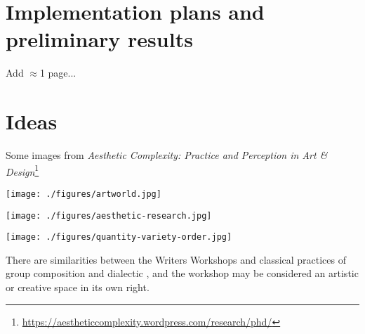 \section{Implementation plans and preliminary results}\label{sec:implementation}

Add $\approx$1 page...

\section{Ideas}

Some images from \emph{Aesthetic Complexity: Practice and Perception in Art \& Design}\footnote{\url{https://aestheticcomplexity.wordpress.com/research/phd/}}

\texttt{[image: ./figures/artworld.jpg]}

\texttt{[image: ./figures/aesthetic-research.jpg]}

\texttt{[image: ./figures/quantity-variety-order.jpg]}


%
%

%




There are similarities between the
Writers Workshops and classical practices of group composition
\cite{jin1975art} and dialectic \cite{dialectique}, and the workshop
may be considered an artistic or creative space in its own right.
